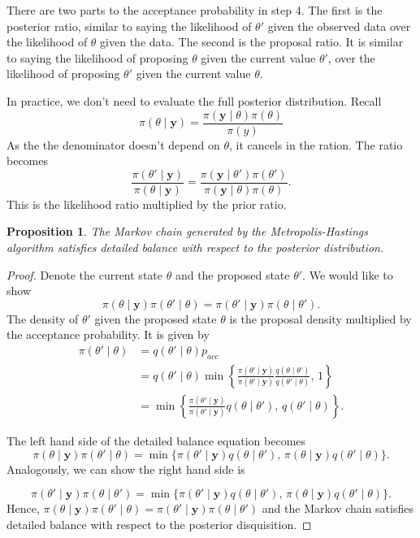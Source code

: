 \documentclass[
]{book}
\newtheorem{proposition}{Proposition}[chapter]
\theoremstyle{definition}
\theoremstyle{definition}
\theoremstyle{definition}
\theoremstyle{definition}
\theoremstyle{remark}
\begin{document}
There are two parts to the acceptance probability in step 4. The first is the posterior ratio, similar to saying the likelihood of \(\theta'\) given the observed data over the likelihood of \(\theta\) given the data. The second is the proposal ratio. It is similar to saying the likelihood of proposing \(\theta\) given the current value \(\theta'\), over the likelihood of proposing \(\theta'\) given the current value \(\theta\).

In practice, we don't need to evaluate the full posterior distribution. Recall
\[
\pi(\theta \mid \boldsymbol{y}) = \frac{\pi(\boldsymbol{y} \mid \theta) \pi(\theta)}{\pi(y)}
\]
As the the denominator doesn't depend on \(\theta\), it cancels in the ration. The ratio becomes
\[
\frac{\pi(\theta' \mid \boldsymbol{y})}{\pi(\theta \mid \boldsymbol{y})} = \frac{\pi(\boldsymbol{y} \mid \theta') \pi(\theta')}{\pi(\boldsymbol{y} \mid \theta) \pi(\theta)}.
\]
This is the likelihood ratio multiplied by the prior ratio.

\begin{proposition}
The Markov chain generated by the Metropolis-Hastings algorithm satisfies detailed balance with respect to the posterior distribution.
\end{proposition}

\begin{proof}
Denote the current state \(\theta\) and the proposed state \(\theta'\). We would like to show
\[
\pi(\theta \mid \boldsymbol{y}) \pi(\theta'\mid\theta) = \pi(\theta' \mid \boldsymbol{y}) \pi(\theta\mid\theta').
\]
The density of \(\theta'\) given the proposed state \(\theta\) is the proposal density multiplied by the acceptance probability. It is given by
\begin{align*}
\pi(\theta' \mid \theta) &= q(\theta' \mid \theta)p_{acc}\\
&=  q(\theta' \mid \theta)\min\left\{\frac{\pi(\theta' \mid \boldsymbol{y})}{\pi(\theta' \mid \boldsymbol{y})}\frac{q(\theta \mid \theta')}{q(\theta' \mid \theta)}, \, 1\right\} \\
& = \min\left\{\frac{\pi(\theta' \mid \boldsymbol{y})}{\pi(\theta' \mid \boldsymbol{y})}q(\theta \mid \theta'),\, q(\theta' \mid \theta)\right\}.
\end{align*}

The left hand side of the detailed balance equation becomes
\[
\pi(\theta \mid \boldsymbol{y})\pi(\theta' \mid \theta) = \min\{\pi(\theta' \mid \boldsymbol{y})q(\theta \mid \theta'),\, \pi(\theta \mid \boldsymbol{y})q(\theta' \mid \theta)\}.
\]
Analogously, we can show the right hand side is

\[
\pi(\theta' \mid \boldsymbol{y})\pi(\theta \mid \theta') = \min\{\pi(\theta' \mid \boldsymbol{y})q(\theta \mid \theta'),\, \pi(\theta \mid \boldsymbol{y})q(\theta' \mid \theta)\}.
\]
Hence, \(\pi(\theta \mid \boldsymbol{y}) \pi(\theta'\mid\theta) = \pi(\theta' \mid \boldsymbol{y}) \pi(\theta\mid\theta')\) and the Markov chain satisfies detailed balance with respect to the posterior disquisition.
\end{proof}
\end{document}
